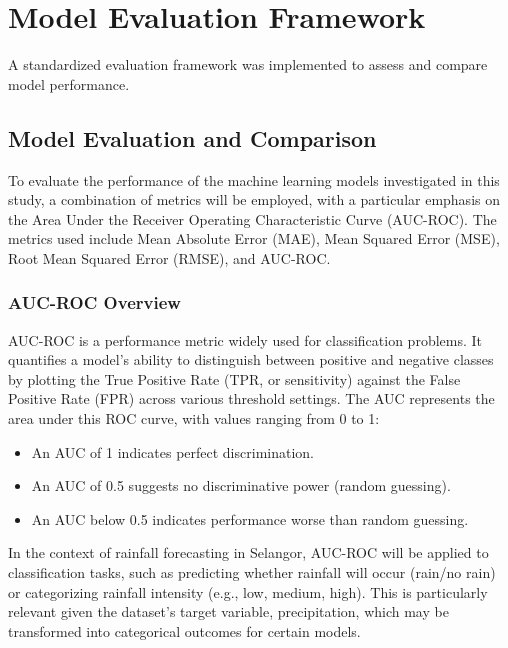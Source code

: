 \documentclass[12pt]{article}
\begin{document}
\section{Model Evaluation Framework}
\label{sec:evaluation_framework}

A standardized evaluation framework was implemented to assess and compare model performance.

\subsection{Model Evaluation and Comparison}
\label{subsec:model_evaluation_comparison}

To evaluate the performance of the machine learning models investigated in this study, a combination of metrics will be employed, with a particular emphasis on the Area Under the Receiver Operating Characteristic Curve (AUC-ROC). The metrics used include Mean Absolute Error (MAE), Mean Squared Error (MSE), Root Mean Squared Error (RMSE), and AUC-ROC.

\subsubsection{AUC-ROC Overview}
AUC-ROC is a performance metric widely used for classification problems. It quantifies a model’s ability to distinguish between positive and negative classes by plotting the True Positive Rate (TPR, or sensitivity) against the False Positive Rate (FPR) across various threshold settings. The AUC represents the area under this ROC curve, with values ranging from 0 to 1:
\begin{itemize}
    \item An AUC of 1 indicates perfect discrimination.
    \item An AUC of 0.5 suggests no discriminative power (random guessing).
    \item An AUC below 0.5 indicates performance worse than random guessing.
\end{itemize}

In the context of rainfall forecasting in Selangor, AUC-ROC will be applied to classification tasks, such as predicting whether rainfall will occur (rain/no rain) or categorizing rainfall intensity (e.g., low, medium, high). This is particularly relevant given the dataset’s target variable, precipitation, which may be transformed into categorical outcomes for certain models.
\end{document}
